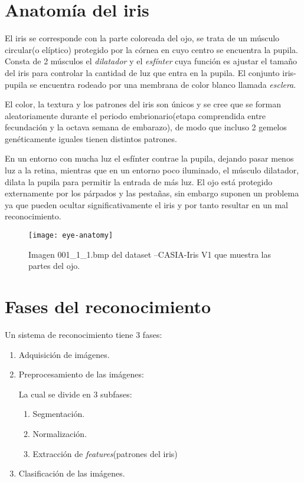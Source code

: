 
\section{Anatomía del iris}
El iris se corresponde con la parte coloreada del ojo, se trata de un músculo circular(o elíptico) protegido por la córnea en cuyo centro se encuentra la pupila. Consta de 2 músculos el \emph{dilatador} y el \emph{esfínter} cuya función es ajustar el tamaño del iris para controlar la cantidad de luz que entra en la pupila.
El conjunto iris-pupila se encuentra rodeado por una membrana de color blanco llamada \emph{esclera}.

El color, la textura y los patrones del iris son únicos y se cree que se forman aleatoriamente durante el periodo embrionario(etapa comprendida entre fecundación y la octava semana de embarazo), de modo que incluso 2 gemelos genéticamente iguales tienen distintos patrones.

En un entorno con mucha luz el esfínter contrae la pupila, dejando pasar menos luz a la retina, mientras que en un entorno poco iluminado, el músculo dilatador, dilata la pupila para permitir la entrada de más luz.
El ojo está protegido externamente por los párpados y las pestañas, sin embargo suponen un problema ya que pueden ocultar significativamente el iris y por tanto resultar en un mal reconocimiento.
\begin{figure}
  \centering
    \texttt{[image: eye-anatomy]}
  \caption{Imagen 001\_1\_1.bmp del dataset --CASIA-Iris V1 que muestra las partes del ojo.}
\end{figure}

\section{Fases del reconocimiento}
Un sistema de reconocimiento tiene 3 fases:
\begin{enumerate}
	\item Adquisición de imágenes.
	\item Preprocesamiento de las imágenes:
	
	La cual se divide en 3 subfases:
	\begin{enumerate}
		\item Segmentación.
		\item Normalización.
		\item Extracción de \emph{features}(patrones del iris)
	\end{enumerate}
	\item Clasificación de las imágenes.

\end{enumerate}

